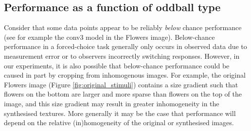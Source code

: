 \documentclass[doc, 11pt,a4paper,natbib]{apa6}\usepackage[]{graphicx}\usepackage[]{color}
\begin{document}
% 








\subsection{Performance as a function of oddball type}

Consider that some data points appear to be reliably \textit{below} chance performance (see for example the conv3 model in the Flowers image).
Below-chance performance in a forced-choice task generally only occurs in observed data due to measurement error or to observers incorrectly switching responses.
However, in our experiments, it is also possible that below-chance performance could be caused in part by cropping from inhomogenous images. 
For example, the original Flowers image (Figure \ref{fig:original_stimuli}) contains a size gradient such that flowers on the bottom are larger and more sparse than flowers on the top of the image, and this size gradient may result in greater inhomogeneity in the synthesised textures.
More generally it may be the case that performance will depend on the relative (in)homogeneity of the original or synthesised images.
\end{document}

